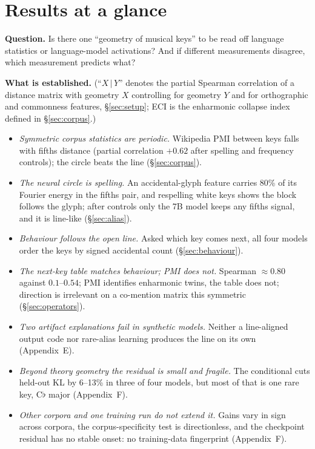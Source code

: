\documentclass[11pt]{article}
\newcommand{\fl}{$\flat$}
\begin{document}
\section*{Results at a glance}\label{sec:glance}

\begin{glancebox}
\noindent\textbf{Question.} Is there one ``geometry of musical keys'' to be read off language statistics or language-model activations? And if different measurements disagree, which measurement predicts what?

\smallskip\noindent\textbf{What is established.} (``$X\,|\,Y$'' denotes the partial Spearman correlation of a distance matrix with geometry $X$ controlling for geometry $Y$ and for orthographic and commonness features, \S\ref{sec:setup}; ECI is the enharmonic collapse index defined in \S\ref{sec:corpus}.)
\begin{itemize}
\item \emph{Symmetric corpus statistics are periodic.} Wikipedia PMI between keys falls with fifths distance (partial correlation $+0.62$ after spelling and frequency controls); the circle beats the line (\S\ref{sec:corpus}).
\item \emph{The neural circle is spelling.} An accidental-glyph feature carries 80\% of its Fourier energy in the fifths pair, and respelling white keys shows the block follows the glyph; after controls only the 7B model keeps any fifths signal, and it is line-like (\S\ref{sec:alias}).
\item \emph{Behaviour follows the open line.} Asked which key comes next, all four models order the keys by signed accidental count (\S\ref{sec:behaviour}).
\item \emph{The next-key table matches behaviour; PMI does not.} Spearman $\approx0.80$ against $0.1$--$0.54$; PMI identifies enharmonic twins, the table does not; direction is irrelevant on a co-mention matrix this symmetric (\S\ref{sec:operators}).
\item \emph{Two artifact explanations fail in synthetic models.} Neither a line-aligned output code nor rare-alias learning produces the line on its own (Appendix~E).
\item \emph{Beyond theory geometry the residual is small and fragile.} The conditional cuts held-out KL by 6--13\% in three of four models, but most of that is one rare key, C\fl{} major (Appendix~F).
\item \emph{Other corpora and one training run do not extend it.} Gains vary in sign across corpora, the corpus-specificity test is directionless, and the checkpoint residual has no stable onset: no training-data fingerprint (Appendix~F).
\end{itemize}


\end{glancebox}
\end{document}
